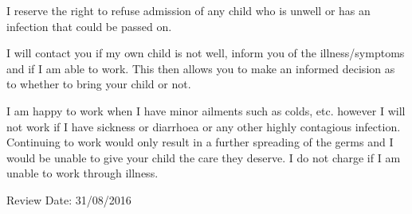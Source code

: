 I reserve the right to refuse admission of any child who is unwell or
has an infection that could be passed on.

I will contact you if my own child is not well, inform you of the
illness/symptoms and if I am able to work. This then allows you to make
an informed decision as to whether to bring your child or not.

I am happy to work when I have minor ailments such as colds, etc.
however I will not work if I have sickness or diarrhoea or any other
highly contagious infection. Continuing to work would only result in a
further spreading of the germs and I would be unable to give your child
the care they deserve. I do not charge if I am unable to work through
illness.

Review Date: 31/08/2016


